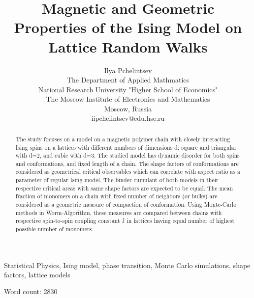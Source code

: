 \documentclass[conference]{IEEEtran}
\title{Magnetic and Geometric Properties of the Ising Model on Lattice Random Walks}
\author{Ilya Pchelintsev\\
The Department of Applied Mathmatics\\
National Research University "Higher School of Economics"\\
The Moscow Institute of Electronics and Mathematics\\
Moscow, Russia\\
iipchelintsev@edu.hse.ru}
\begin{document}
\maketitle



\begin{abstract}
The study focuses on a model on a magnetic polymer chain with closely interacting Ising spins on a lattices with different numbers of dimensions d: square and triangular with d=2, and cubic with d=3. The studied model has dynamic disorder for both spins and conformations, and fixed length of a chain. The shape factors of conformations are considered as geometrical critical observables which can correlate with aspect ratio as a parameter of regular Ising model. The binder cumulant of both models in their respective critical areas with same shape factors are expected to be equal. The mean fraction of monomers on a chain with fixed number of neighbors (or bulks) are considered as a geometric measure of compaction of conformation. Using Monte-Carlo methods in Worm-Algorithm, these measures are compared between chains with respective spin-to-spin coupling constant J in lattices having equal number of highest possible number of monomers. 
\end{abstract}

\begin{IEEEkeywords}
Statistical Physics, Ising model, phase transition, Monte Carlo simulations, shape factors, lattice models
\end{IEEEkeywords}











\null \hfill Word count: 2830

\end{document}
